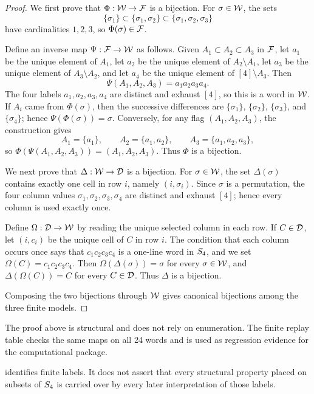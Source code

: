 \begin{proof}
We first prove that \(\Phi:\mathcal W\to\mathcal F\) is a bijection. For \(\sigma\in\mathcal W\), the sets
\[
  \{\sigma_1\}\subset \{\sigma_1,\sigma_2\}\subset \{\sigma_1,\sigma_2,\sigma_3\}
\]
have cardinalities \(1,2,3\), so \(\Phi(\sigma)\in\mathcal F\).

Define an inverse map \(\Psi:\mathcal F\to\mathcal W\) as follows. Given \(A_1\subset A_2\subset A_3\) in \(\mathcal F\), let \(a_1\) be the unique element of \(A_1\), let \(a_2\) be the unique element of \(A_2\setminus A_1\), let \(a_3\) be the unique element of \(A_3\setminus A_2\), and let \(a_4\) be the unique element of \([4]\setminus A_3\). Then
\[
  \Psi(A_1,A_2,A_3)=a_1a_2a_3a_4.
\]
The four labels \(a_1,a_2,a_3,a_4\) are distinct and exhaust \([4]\), so this is a word in \(\mathcal W\). If \(A_i\) came from \(\Phi(\sigma)\), then the successive differences are \(\{\sigma_1\}\), \(\{\sigma_2\}\), \(\{\sigma_3\}\), and \(\{\sigma_4\}\); hence \(\Psi(\Phi(\sigma))=\sigma\). Conversely, for any flag \((A_1,A_2,A_3)\), the construction gives
\[
  A_1=\{a_1\},\qquad A_2=\{a_1,a_2\},\qquad A_3=\{a_1,a_2,a_3\},
\]
so \(\Phi(\Psi(A_1,A_2,A_3))=(A_1,A_2,A_3)\). Thus \(\Phi\) is a bijection.

We next prove that \(\Delta:\mathcal W\to\mathcal D\) is a bijection. For \(\sigma\in\mathcal W\), the set \(\Delta(\sigma)\) contains exactly one cell in row \(i\), namely \((i,\sigma_i)\). Since \(\sigma\) is a permutation, the four column values \(\sigma_1,\sigma_2,\sigma_3,\sigma_4\) are distinct and exhaust \([4]\); hence every column is used exactly once.

Define \(\Omega:\mathcal D\to\mathcal W\) by reading the unique selected column in each row. If \(C\in\mathcal D\), let \((i,c_i)\) be the unique cell of \(C\) in row \(i\). The condition that each column occurs once says that \(c_1c_2c_3c_4\) is a one-line word in \(S_4\), and we set \(\Omega(C)=c_1c_2c_3c_4\). Then \(\Omega(\Delta(\sigma))=\sigma\) for every \(\sigma\in\mathcal W\), and \(\Delta(\Omega(C))=C\) for every \(C\in\mathcal D\). Thus \(\Delta\) is a bijection.

Composing the two bijections through \(\mathcal W\) gives canonical bijections among the three finite models.
\end{proof}

\begin{remark}
\label{rem:indexing-replay}
The proof above is structural and does not rely on enumeration. The finite replay table checks the same maps on all 24 words and is used as regression evidence for the computational package.
\end{remark}

\begin{remark}
\label{rem:indexing-boundary}
 identifies finite labels. It does not assert that every structural property placed on subsets of \(S_4\) is carried over by every later interpretation of those labels.
\end{remark}